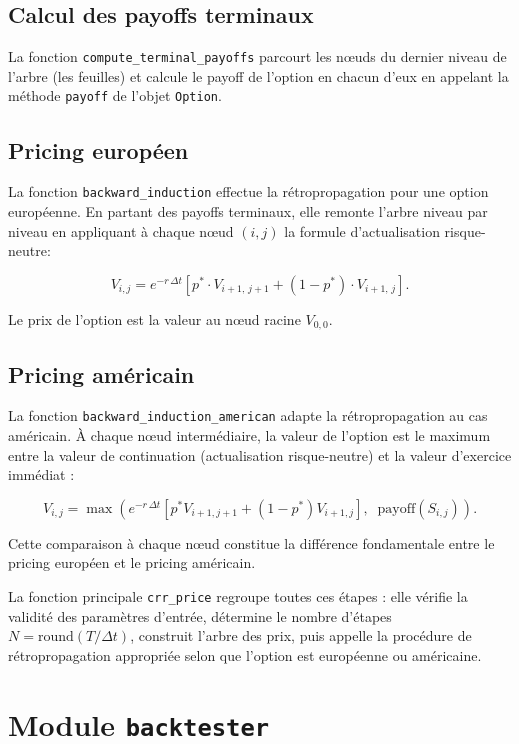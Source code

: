 \documentclass[11pt]{report}
\begin{document}
\subsection{Calcul des payoffs terminaux}

La fonction \texttt{compute\_terminal\_payoffs} parcourt les nœuds du dernier
niveau de l'arbre (les feuilles) et calcule le payoff de l'option en chacun
d'eux en appelant la méthode \texttt{payoff} de l'objet \texttt{Option}.

\subsection{Pricing européen}

La fonction \texttt{backward\_induction} effectue la rétropropagation pour une
option européenne. En partant des payoffs terminaux, elle remonte l'arbre
niveau par niveau en appliquant à chaque nœud $(i, j)$ la formule d'actualisation
risque-neutre:

\[
V_{i,j} = e^{-r\,\Delta t}\!\left[p^* \cdot V_{i+1,\,j+1} + (1-p^*) \cdot V_{i+1,\,j}\right].
\]

Le prix de l'option est la valeur au nœud racine $V_{0,0}$.

\subsection{Pricing américain}

La fonction \texttt{backward\_induction\_american} adapte la rétropropagation
au cas américain. À chaque nœud intermédiaire, la valeur de l'option est
le maximum entre la valeur de continuation (actualisation risque-neutre) et
la valeur d'exercice immédiat :

\[
V_{i,j} = \max\!\left(e^{-r\,\Delta t}\!\left[p^* V_{i+1,j+1} + (1-p^*) V_{i+1,j}\right],\;\; \text{payoff}(S_{i,j})\right).
\]

Cette comparaison à chaque nœud constitue la différence fondamentale entre
le pricing européen et le pricing américain.

La fonction principale \texttt{crr\_price} regroupe toutes ces étapes :
elle vérifie la validité des paramètres d'entrée, détermine le nombre
d'étapes $N = \text{round}(T / \Delta t)$, construit l'arbre des prix,
puis appelle la procédure de rétropropagation appropriée selon que l'option
est européenne ou américaine.

\section{Module \texttt{backtester}}
\end{document}
